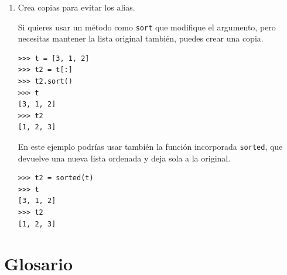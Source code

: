 \documentclass[10pt]{book}
\begin{document}
\begin{enumerate}
\item Crea copias para evitar los alias.

Si quieres usar un método como {\tt sort} que modifique
el argumento, pero necesitas mantener la lista original
también, puedes crear una copia.

\begin{verbatim}
>>> t = [3, 1, 2]
>>> t2 = t[:]
>>> t2.sort()
>>> t
[3, 1, 2]
>>> t2
[1, 2, 3]
\end{verbatim}

En este ejemplo podrías usar también la función incorporada {\tt sorted},
que devuelve una nueva lista ordenada y deja sola a la original.

\begin{verbatim}
>>> t2 = sorted(t)
>>> t
[3, 1, 2]
>>> t2
[1, 2, 3]
\end{verbatim}

\end{enumerate}



\section{Glosario}
\end{document}
